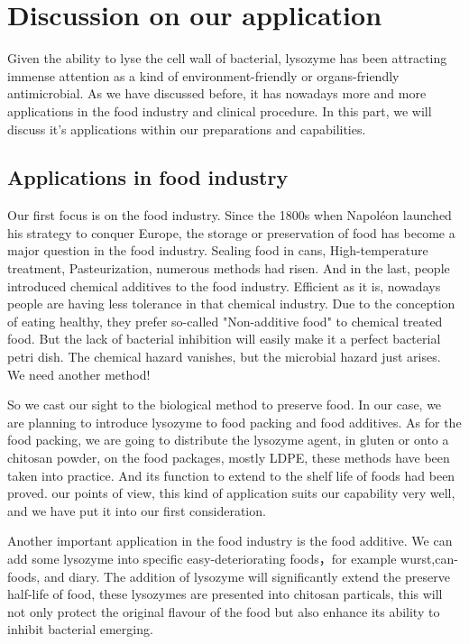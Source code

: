 \documentclass[a4paper,10pt]{article}
\begin{document}
    \section{Discussion on our application}
    Given the ability to lyse the cell wall of bacterial,
    lysozyme has been attracting immense attention as a kind of 
    environment-friendly or organs-friendly antimicrobial.
    As we have discussed before, it has nowadays more and more applications in the food industry and clinical procedure. In this part,  we will discuss 
    it's applications within our preparations and capabilities.
    \subsection{Applications in food industry}
    Our first focus is on the food industry. Since the 1800s when Napoléon launched his strategy to conquer Europe, the storage or preservation of food has become a major question in the food industry. Sealing food in cans, High-temperature treatment, Pasteurization, numerous methods had risen. And in the last, people introduced chemical additives to the food industry. Efficient as it is, nowadays people are having less tolerance in that chemical industry. Due to the conception of eating healthy, they prefer so-called "Non-additive food" to chemical treated food. But the lack of bacterial inhibition will easily make it a perfect bacterial petri dish. The chemical hazard vanishes, but the microbial hazard just arises. We need another method!
    
    So we cast our sight to the biological method to preserve food. In our case, we are planning to introduce lysozyme to food packing and food additives. As for the food packing, we are going to distribute the lysozyme agent, in gluten\citep{Conte2006} or onto a chitosan powder, on the food packages, mostly LDPE, these methods have been taken into practice\citep{Borzooeian2017}. And its function to extend to the shelf life of foods had been proved.\citep{Lian2012, Alhazmi2014} our points of view, this kind of application suits our capability very well, and we have put it into our first consideration.

    Another important application in the food industry is the food additive. We can add some lysozyme into specific easy-deteriorating foods，for example wurst,can-foods, and diary. The addition of lysozyme will significantly extend the preserve half-life of food, these lysozymes are presented into chitosan particals\citep{Wu2017}, this will not only protect the original flavour of the food but also enhance its ability to inhibit bacterial emerging.
\end{document}
